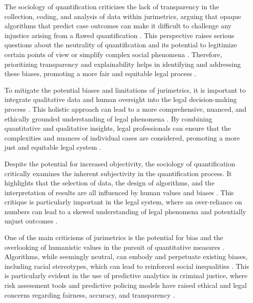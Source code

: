 The sociology of quantification criticizes the lack of transparency in the collection, coding, and analysis of data within jurimetrics, arguing that opaque algorithms that predict case outcomes can make it difficult to challenge any injustice arising from a flawed quantification \cite{10.1590/data.2022.65.3.267,10.1057/s41599-020-0396-5}. This perspective raises serious questions about the neutrality of quantification and its potential to legitimize certain points of view or simplify complex social phenomena \cite{10.1111/ilr.12067, de2010jurimetrics}. Therefore, prioritizing transparency and explainability helps in identifying and addressing these biases, promoting a more fair and equitable legal process \cite{10.1007/s11186-021-09453-1,loevinger1959}.

To mitigate the potential biases and limitations of jurimetrics, it is important to integrate qualitative data and human oversight into the legal decision-making process \cite{10.1590/data.2022.65.3.267,10.1057/s41599-020-00557-0}. This holistic approach can lead to a more comprehensive, nuanced, and ethically grounded understanding of legal phenomena \cite{10.1590/data.2022.65.3.267,10.1057/s41599-020-00557-0}. By combining quantitative and qualitative insights, legal professionals can ensure that the complexities and nuances of individual cases are considered, promoting a more just and equitable legal system \cite{10.1590/data.2022.65.3.267,10.1057/s41599-020-00557-0}.

Despite the potential for increased objectivity, the sociology of quantification critically examines the inherent subjectivity in the quantification process. It highlights that the selection of data, the design of algorithms, and the interpretation of results are all influenced by human values and biases \cite{10.1057/s41599-020-00557-0, de2010jurimetrics}. This critique is particularly important in the legal system, where an over-reliance on numbers can lead to a skewed understanding of legal phenomena and potentially unjust outcomes \cite{10.1057/s41599-020-00557-0, de2010jurimetrics}.

One of the main criticisms of jurimetrics is the potential for bias and the overlooking of humanistic values in the pursuit of quantitative measures \cite{10.1177/09596801221075807, de2010jurimetrics}. Algorithms, while seemingly neutral, can embody and perpetuate existing biases, including racial stereotypes, which can lead to reinforced social inequalities \cite{10.1590/data.2022.65.3.267,in the lawviewmetadatacitationsimilarpapers2014}. This is particularly evident in the use of predictive analytics in criminal justice, where risk assessment tools and predictive policing models have raised ethical and legal concerns regarding fairness, accuracy, and transparency \cite{10.1515/9781400829699,nayler2010}.

